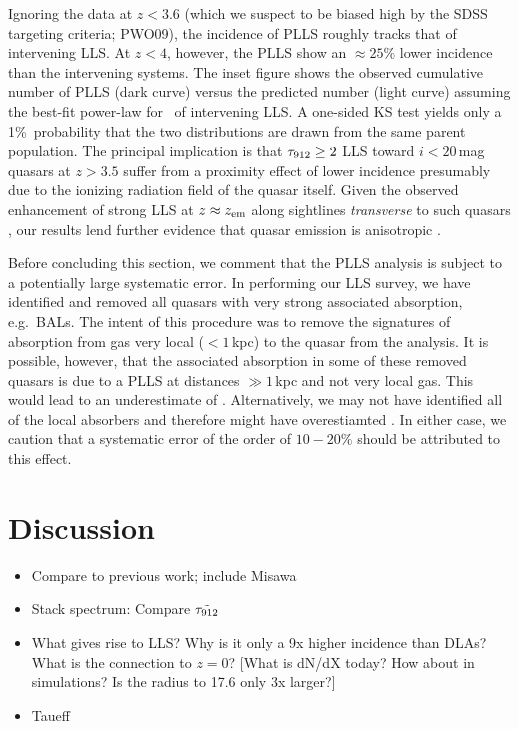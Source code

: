 \documentclass[12pt,preprint]{aastex}
\begin{document}
Ignoring the data at $z < 3.6$ (which we suspect to be biased high
by the SDSS targeting criteria; PWO09), the
incidence of PLLS roughly tracks that of intervening LLS.
At $z<4$, however, the PLLS show an $\approx 25\%$ lower
incidence than the intervening systems.  The inset figure
shows the observed cumulative number of PLLS (dark curve) versus
the predicted number (light curve) assuming the best-fit power-law
for \lzlls\ of intervening LLS.
A one-sided KS test yields only a 1\%\ probability that the
two distributions are drawn from the same parent population.
The principal implication is that $\tau_{\rm 912} \ge 2$ LLS toward
$i<20$\,mag quasars at $z>3.5$ suffer from a proximity effect
of lower incidence presumably due to the ionizing radiation
field of the quasar itself.
Given the observed enhancement of strong LLS at $z \approx z_{\rm em}$
along sightlines {\it transverse} to such quasars
\citep{hpb+06}, our results lend further evidence that quasar emission
is anisotropic \citep{hp07}.

Before concluding this section, we comment that the PLLS
analysis is subject to a potentially large systematic error.
In performing our LLS survey, we have identified and removed
all quasars with very strong associated absorption,
e.g.\ BALs.  The intent of this procedure was to remove the
signatures of absorption from gas very local 
($<1$\,kpc) to the quasar from the analysis.  It is possible, however,
that the associated absorption in some of these removed
quasars is due to a PLLS at distances $\gg 1$\,kpc and not very
local gas.
This would lead to an underestimate of \lplls.
Alternatively, we may not have identified all of the
local absorbers and therefore might have overestiamted \lplls.
In either case, we caution that a systematic error of the
order of $10-20\%$ should be attributed to this effect.



\section{Discussion}
\label{sec:discuss}

\begin{itemize}
\item  Compare to previous work; include Misawa
\item  Stack spectrum:  Compare $\tilde{\tau_{\rm 912}}$
\item  What gives rise to LLS?  Why is it only a 9x higher incidence than DLAs?
  What is the connection to $z=0$?
[What is dN/dX today?  How about in simulations?  Is the radius to
17.6 only 3x larger?]
\item  Taueff
\end{itemize}
\end{document}
